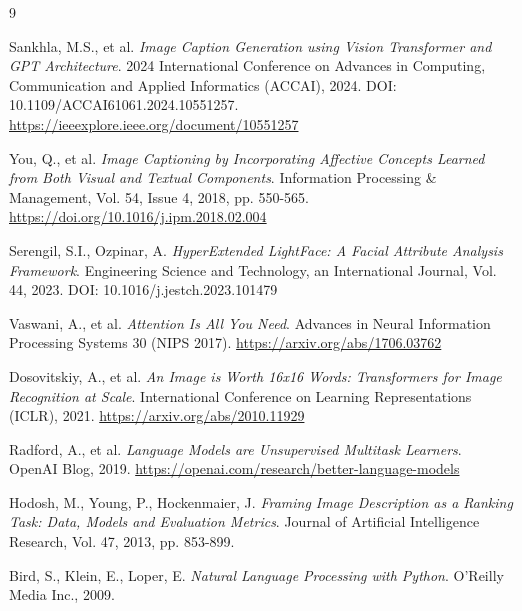 \documentclass[12pt]{article}
\begin{document}
\begin{thebibliography}{9}

Sankhla, M.S., et al.
\textit{Image Caption Generation using Vision Transformer and GPT Architecture}.
2024 International Conference on Advances in Computing, Communication and Applied Informatics (ACCAI), 2024.
DOI: 10.1109/ACCAI61061.2024.10551257.
\url{https://ieeexplore.ieee.org/document/10551257}

You, Q., et al.
\textit{Image Captioning by Incorporating Affective Concepts Learned from Both Visual and Textual Components}.
Information Processing \& Management, Vol. 54, Issue 4, 2018, pp. 550-565.
\url{https://doi.org/10.1016/j.ipm.2018.02.004}

Serengil, S.I., Ozpinar, A.
\textit{HyperExtended LightFace: A Facial Attribute Analysis Framework}.
Engineering Science and Technology, an International Journal, Vol. 44, 2023.
DOI: 10.1016/j.jestch.2023.101479

Vaswani, A., et al.
\textit{Attention Is All You Need}.
Advances in Neural Information Processing Systems 30 (NIPS 2017).
\url{https://arxiv.org/abs/1706.03762}

Dosovitskiy, A., et al.
\textit{An Image is Worth 16x16 Words: Transformers for Image Recognition at Scale}.
International Conference on Learning Representations (ICLR), 2021.
\url{https://arxiv.org/abs/2010.11929}

Radford, A., et al.
\textit{Language Models are Unsupervised Multitask Learners}.
OpenAI Blog, 2019.
\url{https://openai.com/research/better-language-models}

Hodosh, M., Young, P., Hockenmaier, J.
\textit{Framing Image Description as a Ranking Task: Data, Models and Evaluation Metrics}.
Journal of Artificial Intelligence Research, Vol. 47, 2013, pp. 853-899.

Bird, S., Klein, E., Loper, E.
\textit{Natural Language Processing with Python}.
O'Reilly Media Inc., 2009.

\end{thebibliography}

\end{document}
